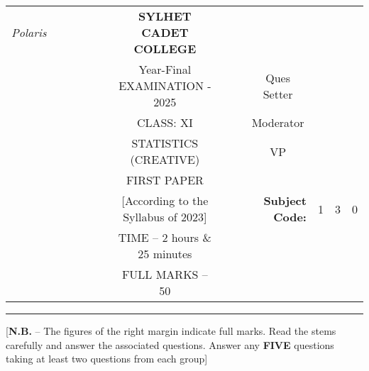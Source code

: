 \documentclass[12pt]{article}
\begin{document}
\begin{table}[]
\begin{tabular}{llllllcllrlll}
\textit{Polaris} &  &  &  &  &  & \textbf{SYLHET CADET COLLEGE}       &  &                       & \multicolumn{1}{l}{}                        &                        &                        &                        \\ \cline{10-13} 
                 &  &  &  &  &  & Year-Final EXAMINATION - 2025             &  & \multicolumn{1}{l|}{} & \multicolumn{1}{c|}{Ques Setter}            & \multicolumn{3}{l|}{}                                                    \\ \cline{10-13} 
                 &  &  &  &  &  & CLASS: XI                         &  & \multicolumn{1}{l|}{} & \multicolumn{1}{c|}{Moderator}              & \multicolumn{3}{l|}{}                                                    \\ \cline{10-13} 
                 &  &  &  &  &  & STATISTICS (CREATIVE)               &  & \multicolumn{1}{l|}{} & \multicolumn{1}{c|}{VP}                     & \multicolumn{3}{l|}{}                                                    \\ \cline{10-13} 
                 &  &  &  &  &  & FIRST PAPER                        &  &                       &                                             &                        &                        &                        \\ \cline{11-13} 
                 &  &  &  &  &  & [According to the Syllabus of 2023] &  &                       & \multicolumn{1}{r|}{\textbf{Subject Code:}} & \multicolumn{1}{l|}{1} & \multicolumn{1}{l|}{3} & \multicolumn{1}{l|}{0} \\ \cline{11-13} 
                 &  &  &  &  &  & TIME – 2 hours \& 25 minutes        &  &                       &                                             &                        &                        &                        \\
                 &  &  &  &  &  & FULL MARKS – 50                     &  &                       & \textbf{}                                   &                        &                        &                       
\end{tabular}
\end{table}

\hrule

\begin{center}
[\textbf{N.B.} – The figures of the right margin indicate full marks. Read the stems carefully and answer the associated questions. Answer any \textbf{FIVE} questions taking at least two questions from each group]\\
\end{center}
\end{document}
